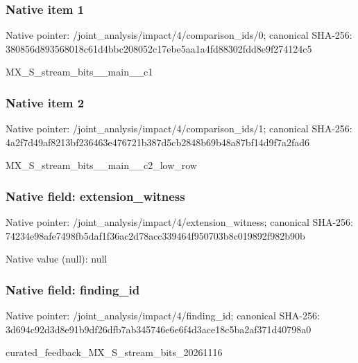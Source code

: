 \documentclass[10pt,a4paper]{article}
\begin{document}
\subsubsection{Native item 1}
Native pointer: /joint\_\allowbreak{}analysis/impact/4/comparison\_\allowbreak{}ids/0; canonical SHA-256: 380856d893568018c61d4bbc208052c17ebe5aa1a4fd88302fdd8e9f274124c5

\begingroup\raggedright\sloppy MX\_\allowbreak{}S\_\allowbreak{}stream\_\allowbreak{}bits\_\allowbreak{}\_\allowbreak{}main\_\allowbreak{}\_\allowbreak{}c1\par\endgroup

\subsubsection{Native item 2}
Native pointer: /joint\_\allowbreak{}analysis/impact/4/comparison\_\allowbreak{}ids/1; canonical SHA-256: 4a2f7d49af8213bf236463e476721b387d5cb2848b69b48a87bf14d9f7a2fad6

\begingroup\raggedright\sloppy MX\_\allowbreak{}S\_\allowbreak{}stream\_\allowbreak{}bits\_\allowbreak{}\_\allowbreak{}main\_\allowbreak{}\_\allowbreak{}c2\_\allowbreak{}low\_\allowbreak{}row\par\endgroup

\subsubsection{Native field: extension\_\allowbreak{}witness}
Native pointer: /joint\_\allowbreak{}analysis/impact/4/extension\_\allowbreak{}witness; canonical SHA-256: 74234e98afe7498fb5daf1f36ac2d78acc339464f950703b8c019892f982b90b

Native value (null): null

\subsubsection{Native field: finding\_\allowbreak{}id}
Native pointer: /joint\_\allowbreak{}analysis/impact/4/finding\_\allowbreak{}id; canonical SHA-256: 3d694c92d3d8e91b9df26dfb7ab345746e6e6f4d3ace18c5ba2af371d40798a0

\begingroup\raggedright\sloppy curated\_\allowbreak{}feedback\_\allowbreak{}MX\_\allowbreak{}S\_\allowbreak{}stream\_\allowbreak{}bits\_\allowbreak{}20261116\par\endgroup
\end{document}
